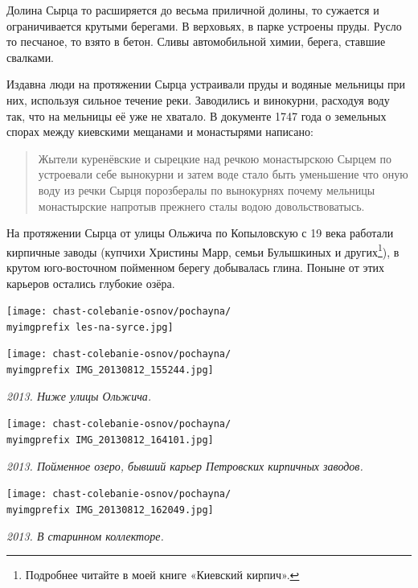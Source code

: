 Долина Сырца то расширяется до весьма приличной долины, то сужается и ограничивается крутыми берегами. В верховьях, в парке устроены пруды. Русло то песчаное, то взято в бетон. Сливы автомобильной химии, берега, ставшие свалками.

Издавна люди на протяжении Сырца устраивали пруды и водяные мельницы при них, используя сильное течение реки. Заводились и винокурни, расходуя воду так, что на мельницы её уже не хватало. В документе 1747 года\cite[вып. 6, стр. 57]{histmatkiev} о земельных спорах между киевскими мещанами и монастырями написано:

\begin{quotation}
Жытели куренёвские и сырецкие над речкою монастырскою Сырцем по устроевали себе вынокурни и затем воде стало быть уменьшение что оную воду из речки Сырця порозбералы по вынокурнях почему мельницы монастырские напротыв прежнего сталы водою довольствоватысь.
\end{quotation}

На протяжении Сырца от улицы Ольжича по Копыловскую с 19 века работали кирпичные заводы (купчихи Христины Марр, семьи Булышкиных и других\footnote{Подробнее читайте в моей книге «Киевский кирпич».}), в крутом юго-восточном пойменном берегу добывалась глина. Поныне от этих карьеров остались глубокие озёра.

\begin{center}
\texttt{[image: chast-colebanie-osnov/pochayna/\\myimgprefix les-na-syrce.jpg]}
\end{center}

\newpage

\begin{center}
\texttt{[image: chast-colebanie-osnov/pochayna/\\myimgprefix IMG\_20130812\_155244.jpg]}
\end{center}

\textit{2013. Ниже улицы Ольжича.}

\begin{center}
\texttt{[image: chast-colebanie-osnov/pochayna/\\myimgprefix IMG\_20130812\_164101.jpg]}

\textit{2013. Пойменное озеро, бывший карьер Петровских кирпичных заводов.}
\end{center}

\newpage

\begin{center}
\texttt{[image: chast-colebanie-osnov/pochayna/\\myimgprefix IMG\_20130812\_162049.jpg]}

\textit{2013. В старинном коллекторе.}
\end{center}

